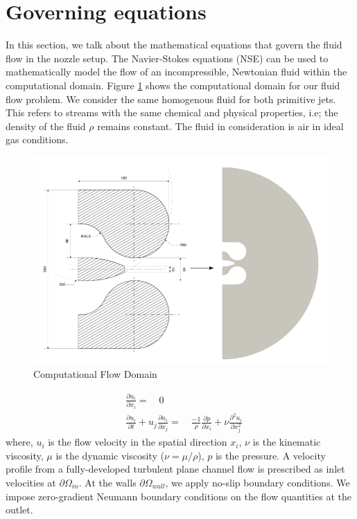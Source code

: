 \section{Governing equations}
In this section, we talk about the mathematical equations that govern the fluid flow in the nozzle setup. The Navier-Stokes equations (NSE) can be used to mathematically model the flow of an incompressible, Newtonian fluid within the computational domain. Figure \ref{fig:Domain} shows the computational domain for our fluid flow problem. We consider the same homogenous fluid for both primitive jets. This refers to streams with the same chemical and physical properties, i.e; the density of the fluid $\rho$ remains constant. The fluid in consideration is air in ideal gas conditions. 
\begin{figure}[ht]
  \centering
  \includegraphics[width=12cm]{images/Theory-CFD/Flow Domain.png}
  \caption{Computational Flow Domain}
  \label{fig:Domain}
\end{figure}
\begin{equation}
  \begin{aligned}
  &\frac{\partial u_i}{\partial x_i}=\quad0\\
  &\frac{\partial u_i}{\partial t}+u_j \frac{\partial u_i}{\partial x_j}=\quad\frac{-1}{\rho} \frac{\partial p}{\partial x_i}+\nu \frac{\partial^2 u_i}{\partial x_j^2}
  \end{aligned}
  \end{equation}
where, $u_i$ is the flow velocity in the spatial direction $x_i$, $\nu$ is the kinematic viscosity, $\mu$ is the dynamic viscosity ($\nu = \mu / \rho$), $p$ is the pressure. A velocity profile from a fully-developed turbulent plane channel flow is prescribed as inlet velocities at $\partial{\Omega_{in}}$. At the walls $\partial{\Omega_{wall}}$, we apply no-slip boundary conditions. We impose zero-gradient Neumann boundary conditions on the flow quantities at the outlet.\\

